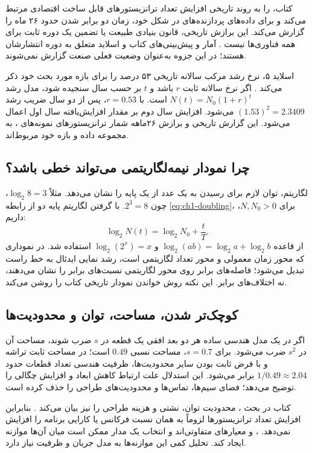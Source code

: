 کتاب،  را به روند تاریخی افزایش تعداد ترانزیستورهای قابل ساخت
اقتصادی مرتبط می‌کند و برای داده‌های پردازنده‌های  در شکل
 خود، زمان دو برابر شدن حدود ۲۶ ماه را گزارش می‌کند.
این برازش تاریخی، قانون بنیادی طبیعت یا تضمین یک دوره ثابت برای همه فناوری‌ها نیست
\cite[صفحات چاپی ۳ و ۴]{weste}\cite[اسلاید ۹]{intro}.
آمار و پیش‌بینی‌های کتاب و اسلاید متعلق به دوره انتشارشان هستند؛
در این جزوه به‌عنوان وضعیت فعلی صنعت گزارش نمی‌شوند.

اسلاید ۵، نرخ رشد مرکب سالانه تاریخی ۵۳ درصد را برای بازه مورد بحث خود ذکر
می‌کند \cite{intro}. اگر نرخ سالانه ثابت \(r\) باشد و \(t\) بر حسب سال سنجیده
شود، مدل رشد \(N(t)=N_0(1+r)^t\) است.
با \(r=0.53\)، پس از دو سال ضریب رشد \((1.53)^2=2.3409\) می‌شود.
افزایش سال دوم بر مقدار افزایش‌یافته سال اول اعمال می‌شود.
این گزارش تاریخی و برازش ۲۶ماهه شمار ترانزیستورهای نمونه‌های ،
به مجموعه داده و بازه خود مربوط‌اند.

\subsection{چرا نمودار نیمه‌لگاریتمی می‌تواند خطی باشد؟}
لگاریتم، توان لازم برای رسیدن به یک عدد از یک پایه را نشان می‌دهد.
مثلاً \(\log_2 8=3\)، چون \(2^3=8\).
با گرفتن لگاریتم پایه دو از رابطه \eqref{eq:ch1-doubling}، برای \(N,N_0>0\)، داریم:
\begin{equation}\label{eq:ch1-semilog}
\log_2 N(t)=\log_2 N_0+\frac{t}{T}.
\end{equation}
از قاعده \(\log_2(ab)=\log_2 a+\log_2 b\) و
\(\log_2(2^x)=x\) استفاده شد.
در نموداری که محور زمان معمولی و محور تعداد لگاریتمی است، رشد نمایی ایدئال
به خط راست تبدیل می‌شود؛ فاصله‌های برابر روی محور لگاریتمی نسبت‌های برابر را نشان می‌دهند،
نه اختلاف‌های برابر. این نکته روش خواندن نمودار تاریخی کتاب را روشن می‌کند.

\subsection{کوچک‌تر شدن، مساحت، توان و محدودیت‌ها}
اگر در یک مدل هندسی ساده هر دو بعد افقی یک قطعه در \(s\) ضرب شوند،
مساحت آن در \(s^2\) ضرب می‌شود. برای \(s=0.7\)، مساحت نسبی \(0.49\) است؛
در مساحت ثابت تراشه و با فرض ثابت بودن سایر محدودیت‌ها، ظرفیت هندسی تعداد قطعات
حدود \(1/0.49\approx2.04\) برابر می‌شود. این استدلال علت ارتباط
کاهش ابعاد و افزایش چگالی را توضیح می‌دهد؛ فضای سیم‌ها، تماس‌ها و محدودیت‌های طراحی را حذف کرده است.

کتاب در بحث ، محدودیت توان، نشتی و هزینه طراحی را نیز بیان می‌کند
\cite[صفحات چاپی ۴ تا ۶]{weste}.
بنابراین افزایش تعداد ترانزیستورها لزوماً به همان نسبت فرکانس یا کارایی برنامه را افزایش نمی‌دهد.
،  و  معیارهای متفاوتی‌اند و انتخاب یک مدار
ممکن است میان آن‌ها موازنه ایجاد کند. تحلیل کمی این موازنه‌ها به مدل جریان و ظرفیت نیاز دارد.

